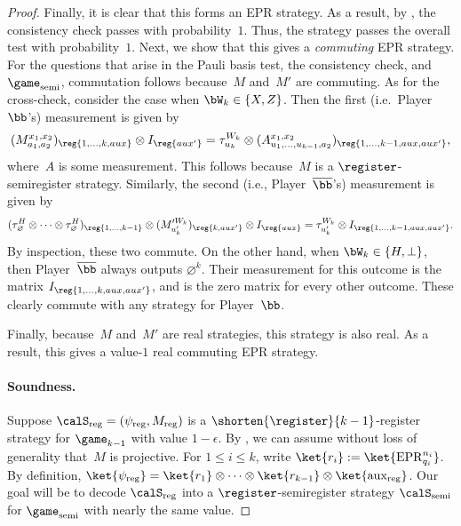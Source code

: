 \begin{proof}
Finally, it is clear that this forms an EPR strategy.
As a result, by ,
the consistency check passes with probability~$1$.
Thus, the strategy passes the overall test with probability~$1$.
Next, we show that this gives a \emph{commuting} EPR strategy.
For the questions that arise in the Pauli basis test, the consistency check, and~$\game_{\mathrm{semi}}$,
commutation follows because~$M$ and~$M'$ are commuting.
As for the cross-check, consider the case when $\bW_k \in \{X, Z\}$.
Then  the first (i.e.\ Player~$\bb$'s) measurement is given by
\begin{equation*}
(M^{x_1, x_2}_{a_1, a_2})_{\reg{1, \ldots, k, aux}} \otimes I_{\reg{aux'}}
= \tau^{W_k}_{u_k} \otimes (A^{x_1, x_2}_{u_1, \ldots, u_{k-1}, a_2})_{\reg{1, \ldots, k-1, aux, aux'}},
\end{equation*}
where~$A$ is some measurement.
This follows because~$M$ is a $\register$-semiregister strategy.
Similarly, the second (i.e., Player~$\overline{\bb}$'s) measurement is given by
\begin{equation*}
(\tau_{\varnothing}^H \otimes \cdots \otimes \tau^H_{\varnothing})_{\reg{1, \ldots, k-1}}
\otimes (M'^{W_k}_{u_k'})_{\reg{k, aux'}} \otimes I_{\reg{aux}}
= \tau^{W_k}_{u_k'} \otimes I_{\reg{1, \ldots, k-1, aux, aux'}}.
\end{equation*}
By inspection, these two commute.
On the other hand, when $\bW_k \in \{H, \bot\}$,
then Player~$\overline{\bb}$ always outputs $\varnothing^k$.
Their measurement for this outcome is the matrix $I_{\reg{1, \ldots, k, aux, aux'}}$,
and is the zero matrix for every other outcome.
These clearly commute with any strategy for Player~$\bb$.

Finally, because~$M$ and~$M'$ are real strategies,
this strategy is also real.
As a result, this gives a value-$1$ real commuting EPR strategy.

\paragraph{Soundness.}

Suppose $\calS_{\mathrm{reg}} = (\psi_{\mathrm{reg}}, M_{\mathrm{reg}})$ is a  $\shorten{\register}{k-1}$-register strategy for $\game_{k-1}$ with value $1-\epsilon$.
By , we can assume without loss of generality that~$M$ is projective.
For $1 \leq i \leq k$, write $\ket{r_i} := \ket{\mathrm{EPR}_{q_i}^{n_i}}$.
By definition, $\ket{\psi_{\mathrm{reg}}} = \ket{r_1} \otimes \cdots \otimes \ket{r_{k-1}} \otimes \ket{\mathrm{aux}_{\mathrm{reg}}}$.
Our goal will be to decode $\calS_{\mathrm{reg}}$ into a $\register$-semiregister strategy $\calS_{\mathrm{semi}}$ for $\game_{\mathrm{semi}}$ with nearly the same value.


\end{proof}

